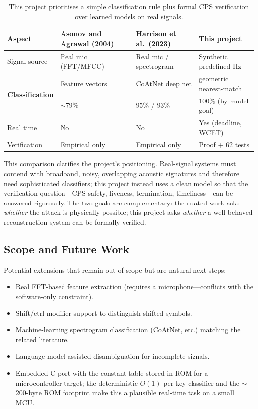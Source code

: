 \documentclass[11pt,a4paper]{article}
\begin{document}
\begin{table}[H]
    \centering
    \begin{tabular}{@{}lp{4.6cm}p{4.6cm}p{3.6cm}@{}}
        \toprule
        \textbf{Aspect} & \textbf{Asonov and Agrawal (2004)} &
        \textbf{Harrison et al.\ (2023)} & \textbf{This project} \\
        \midrule
        Signal source & Real mic (FFT/MFCC) & Real mic /
            spectrogram & Synthetic predefined Hz \\
        \multirow{2}{*}{\textbf{Classification}}
            & Feature vectors & CoAtNet deep net &
            geometric nearest-match \\
        Accuracy & $\sim 79\%$ & $95\%$ / $93\%$ & $100\%$ (by model goal) \\
        Real time & No & No & Yes (deadline, WCET) \\
        Verification & Empirical only & Empirical only &
            Proof + 62 tests \\
        \bottomrule
    \end{tabular}
    \caption{This project prioritises a simple classification rule plus formal
             CPS verification over learned models on real signals.}
    \label{tab:related}
\end{table}

This comparison clarifies the project's positioning. Real-signal systems must
contend with broadband, noisy, overlapping acoustic signatures and therefore
need sophisticated classifiers; this project instead uses a clean model so that
the verification question---CPS safety, liveness, termination, timeliness---can
be answered rigorously. The two goals are complementary: the related work asks
\emph{whether} the attack is physically possible; this project asks
\emph{whether} a well-behaved reconstruction system can be formally verified.

\subsection{Scope and Future Work}

Potential extensions that remain out of scope but are natural next steps:

\begin{itemize}
    \item Real FFT-based feature extraction (requires a microphone---conflicts
          with the software-only constraint).
    \item Shift/ctrl modifier support to distinguish shifted symbols.
    \item Machine-learning spectrogram classification (CoAtNet, etc.) matching
          the related literature.
    \item Language-model-assisted disambiguation for incomplete signals.
    \item Embedded C port with the constant table stored in ROM for a
          microcontroller target; the deterministic $O(1)$ per-key classifier
          and the $\sim$200-byte ROM footprint make this a plausible real-time
          task on a small MCU.
\end{itemize}
\end{document}
